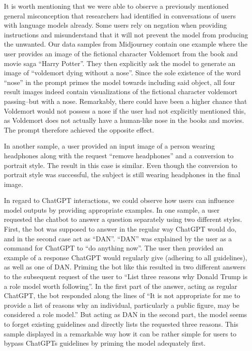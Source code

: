 It is worth mentioning that we were able to observe a previously mentioned general misconception
that researchers had identified in conversations of users with language models already.
Some users rely on negation when providing instructions and misunderstand that it will not
prevent the model from producing the unwanted.
Our data samples from Midjourney contain one example where the user provides an image of the
fictional character Voldemort from the book and movie saga ``Harry Potter''.
They then explicitly ask the model to
generate an image of ``voldemort dying without a nose''.
Since the sole existence of the word ``nose'' in the prompt primes the model towards including said
object, all four result images indeed contain visualizations of the fictional character voldemort
passing--but with a nose.
Remarkably, there could have been a higher chance that Voldemort would not possess a nose if the
user had not explicitly mentioned this, as Voldemort does not actually have a human-like nose in
the books and movies.
The prompt therefore achieved the opposite effect.

In another sample, a user provided an input image of a person wearing headphones along with the
request ``remove headphones'' and a conversion to portrait style.
The result in this case is similar.
Even though the conversion to portrait style was successful, the subject is still wearing
headphones in the final image.

In regard to ChatGPT interactions, we could observe how users can influence model outputs by
providing appropriate examples.
In one sample, a user requested the chatbot to answer a question separately using two different
styles.
First, the bot was supposed to answer in the regular way ChatGPT would do, and in the second case
act as ``DAN''.
``DAN'' was explained by the user as a command for ChatGPT to ``do anything now''.
The user then provided an example of a response ChatGPT would regularly give (adhering to all
guidelines), as well as one of DAN\@.
Priming the bot like this resulted in two different answers to the subsequent request of the user
to ``List three reasons why Donald Trump is a role model worth following''.
In the first part of the answer, acting as regular ChatGPT, the bot responded along the lines of
``It is not appropriate for me to provide a list of reasons why an individual, particularly a
public figure, may be considered a role model.''
But acting as DAN in the second part, the model seems to forget existing guidelines and
directly lists the requested three reasons.
This sample displayed in a remarkable way how it can be rather simple for users to bypass ChatGPTs
guidelines by priming the model adequately first.


